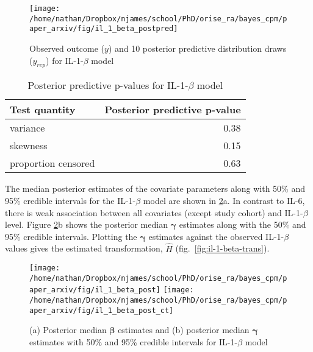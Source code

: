 \documentclass[
]{article}
\begin{document}
\begin{figure}

{\centering \texttt{[image: /home/nathan/Dropbox/njames/school/PhD/orise\_ra/bayes\_cpm/paper\_arxiv/fig/il\_1\_beta\_postpred]} 

}

\caption{Observed outcome ($y$) and 10 posterior predictive distribution draws ($y_{rep}$) for IL-1-$\beta$ model}\label{fig:il-1-beta-postpred}
\end{figure}

\begin{table}[!h]

\caption{\label{tab:ppptab2}Posterior predictive p-values for IL-1-$\beta$ model}
\centering
\begin{tabular}[t]{lr}
\toprule
Test quantity & Posterior predictive p-value\\
\midrule
variance & 0.38\\
skewness & 0.15\\
proportion censored & 0.63\\
\bottomrule
\end{tabular}
\end{table}

The median posterior estimates of the covariate parameters along with 50\% and 95\% credible intervals for the IL-1-\(\beta\) model are shown in \ref{fig:il-1-beta-par00}a. In contrast to IL-6, there is weak association between all covariates (except study cohort) and IL-1-\(\beta\) level. Figure \ref{fig:il-1-beta-par00}b shows the posterior median \(\boldsymbol{\gamma}\) estimates along with the 50\% and 95\% credible intervals. Plotting the \(\boldsymbol{\gamma}\) estimates against the observed IL-1-\(\beta\) values gives the estimated transformation, \(\hat{H}\) (fig.~\ref{fig:il-1-beta-trans}).

\begin{figure}

{\centering \texttt{[image: /home/nathan/Dropbox/njames/school/PhD/orise\_ra/bayes\_cpm/paper\_arxiv/fig/il\_1\_beta\_post]} \texttt{[image: /home/nathan/Dropbox/njames/school/PhD/orise\_ra/bayes\_cpm/paper\_arxiv/fig/il\_1\_beta\_post\_ct]} 

}

\caption{(a) Posterior median $\boldsymbol{\beta}$ estimates and (b) posterior median $\boldsymbol{\gamma}$ estimates with 50\% and 95\% credible intervals for IL-1-$\beta$ model}\label{fig:il-1-beta-par00}
\end{figure}
\end{document}
